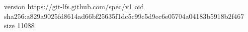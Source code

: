 version https://git-lfs.github.com/spec/v1
oid sha256:a829a9025fd8614ad66bf25635f1dc5c99c5d9ec6e05704a04183b5918b2f467
size 11088
